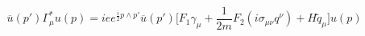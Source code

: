 \begin{equation}
\overline{u}(p')\Gamma_{\mu}^{\ast}u(p)=iee^{\frac{i}{2}p\wedge
p'}\overline{u}(p')\biggl[\textit{F}_{1}\gamma_{\mu}
+\frac{1}{2m}\textit{F}_{2}\left(i\sigma_{\mu\nu}q^{\nu}\right)
+\textit{H}\widetilde{q}_{\mu}\biggr]u(p)
\end{equation}

